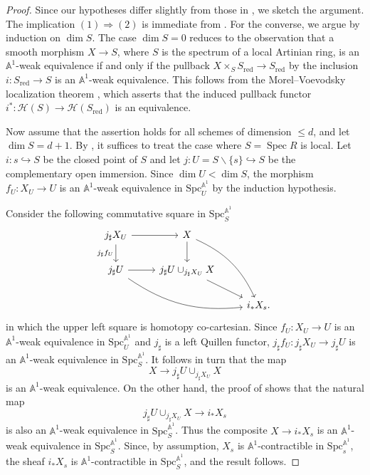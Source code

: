 \documentclass[10pt]{amsart}
\renewcommand{\AA}{\mathbb{A}}
\newcommand{\Spec}{\operatorname{Spec}}
\newcommand{\mcal}[1]{\mathcal{#1}}
\renewcommand{\setminus}{\smallsetminus}
\numberwithin{equation}{section} %
\theoremstyle{plain}
\theoremstyle{definition}
\theoremstyle{remark}
\begin{document}
\begin{proof}
Since our hypotheses differ slightly from those in \cite[Proposition~2.1]{ABEH-real-etale}, we sketch the argument. The implication $(1)\Rightarrow(2)$ is immediate from . For the converse, we argue by induction on $\dim S$. The case $\dim S=0$ reduces to the observation that a smooth morphism 
$X\to S$, where $S$ is the spectrum of a local Artinian ring, is an $\AA^1$-weak equivalence if and only if the pullback $X\times_{S}S_{\mathrm{red}}\to 
S_{\mathrm{red}}$ by the inclusion $i:S_{\mathrm{red}}\to S$ is an $\AA^1$-weak equivalence. This follows from the Morel–Voevodsky localization theorem \cite[Theorem 3.2.21]{MV99}, which asserts that the induced pullback functor $i^\ast\colon \mcal{H}(S)\to \mcal{H}(S_{\mathrm{red}})$ is an equivalence.
\medskip

Now assume that the assertion holds for all schemes of dimension $\le d$, and let $\dim S=d+1$. By , it suffices to treat the case where $S=\Spec R$ is local. Let $i:s\hookrightarrow S$ be the closed point of $S$ and let $j:U=S\setminus\{s\}\hookrightarrow S$ be the complementary open immersion. Since $\dim U<\dim S$, the morphism $f_U:X_U\rightarrow U$ is an $\AA^1$-weak equivalence in $\mathrm{Spc}_U^{\AA^1}$ by the induction hypothesis. 
\medskip

Consider the following commutative square in $\mathrm{Spc}_S^{\AA^1}$
\[
\begin{tikzcd}
  j_\sharp X_U \arrow[r] \arrow[d,swap ,"j_\sharp f_U"] 
    & X \arrow[d] \arrow[ddr, bend left=20]\\
  j_\sharp U \arrow[r]  \arrow[drr, bend right=20]
    & j_\sharp U\cup_{j_\sharp X_U} X \arrow[dr] \\  & & i_* X_s.
\end{tikzcd}
\]
in which the upper left square is homotopy co-cartesian.
Since $f_U:X_U\to U$ is an $\mathbb{A}^1$-weak equivalence in $\mathrm{Spc}_U^{\AA^1}$ and $j_\sharp$ is a left Quillen functor, $j_{\sharp}f_U:j_\sharp X_U\to j_\sharp U$ is an $\mathbb{A}^1$-weak equivalence in $\mathrm{Spc}_S^{\AA^1}$. It follows in turn that the map
\[
X\to j_\sharp U\cup_{j_\sharp X_U}X
\]
is an $\AA^1$-weak equivalence. On the other hand, the proof of \cite[Theorem~2.21]{MV99} shows that the natural map 
\[
j_\sharp U\cup_{j_\sharp X_U}X \to  i_* X_s
\]
is also an $\AA^1$-weak equivalence in $\mathrm{Spc}_S^{\AA^1}$. Thus the composite $X\to i_*X_s$ is an $\AA^1$-weak equivalence in $\mathrm{Spc}_S^{\AA^1}$. Since, by assumption, $X_s$ is $\mathbb{A}^1$-contractible in $\mathrm{Spc}_s^{\AA^1}$, the sheaf $i_*X_s$ is $\mathbb{A}^1$-contractible in $\mathrm{Spc}_S^{\AA^1}$, and the result follows.
\end{proof}
\end{document}
